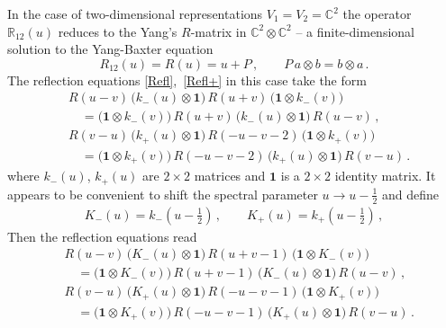 \documentclass[a4paper,11pt]{article}
\numberwithin{equation}{section}
\begin{document}
In the case of two-dimensional representations $V_1=V_2=\mathbb{C}^2$ the operator $\mathbb{R}_{12}(u)$ reduces \cite{DM09,CDS} to the Yang's $R$-matrix in $\mathbb{C}^2\otimes \mathbb{C}^2$ -- a finite-dimensional solution to the Yang-Baxter equation
\begin{equation} \label{Rmat1}
	R_{12}(u) = R(u) = u  + P \,, \qquad P\,a \otimes b = b \otimes a \,.
\end{equation}
The reflection equations \eqref{Refl},~\eqref{Refl+} in this case take the form
\begin{equation} \nonumber
    \begin{aligned}
        &R(u-v)\, \bigl(k_-(u)\otimes \bm{1}\bigr)\,R(u+v)\, \bigl(\bm{1} \otimes k_-(v)\bigr) \\
        &\quad = \bigl(\bm{1} \otimes k_-(v)\bigr)\,R(u+v)\,\bigl(k_-(u)\otimes \bm{1}\bigr)\, R(u-v) \,, \\[0.6em]
        &R(v-u)\, \bigl(k_+(u)\otimes \bm{1}\bigr)\,R(-u-v-2)\, \bigl(\bm{1} \otimes k_+(v)\bigr) \\
        &\quad = \bigl(\bm{1} \otimes k_+(v)\bigr)\,R(-u-v-2)\,\bigl(k_+(u)\otimes \bm{1}\bigr)\, R(v-u) \,.
    \end{aligned}
\end{equation}
where $k_-(u)$, $k_+(u)$ are $2\times 2$ matrices and $\bm{1}$ is a $2\times 2$ identity matrix. 
It appears to be convenient to shift the spectral parameter $u\to u-\frac{1}{2}$ and define
\begin{align*}
	K_-(u) = k_-(u-\frac{1}{2}) \,, \qquad K_+(u) = k_+(u-\frac{1}{2}) \,,
\end{align*}
Then the reflection equations read
\begin{align} 
    & \nonumber
    R(u-v)\, \bigl(K_-(u)\otimes \bm{1}\bigr)\,R(u+v-1)\, \bigl(\bm{1} \otimes K_-(v)\bigr) \\
    \label{Reflshifted}
    &\quad = \bigl(\bm{1} \otimes K_-(v)\bigr)\,R(u+v-1)\,\bigl(K_-(u)\otimes \bm{1}\bigr)\, R(u-v) \,, \\[0.6em]
    & \nonumber
    R(v-u)\, \bigl(K_+(u)\otimes \bm{1}\bigr)\,R(-u-v-1)\, \bigl(\bm{1} \otimes K_+(v)\bigr) \\
    \label{Reflshifted+}
    &\quad = \bigl(\bm{1} \otimes K_+(v)\bigr)\,R(-u-v-1)\,\bigl(K_+(u)\otimes \bm{1}\bigr)\, R(v-u) \,.
\end{align}
\end{document}
